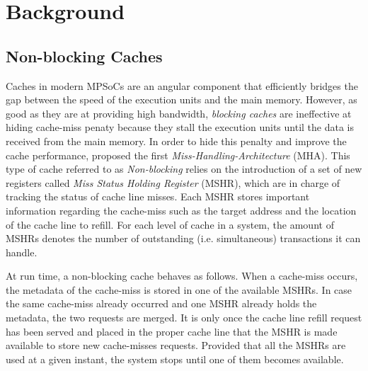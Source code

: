 \section{Background}
    \subsection{Non-blocking Caches}
        Caches in modern MPSoCs are an angular component that efficiently bridges the gap between the speed of the execution units and the main memory.
        However, as good as they are at providing high bandwidth, \emph{blocking caches} are ineffective at hiding cache-miss penaty because they stall the execution units until the data is received from the main memory.
        In order to hide this penalty and improve the cache performance, \cite{Kroft} proposed the first \emph{Miss-Handling-Architecture} (MHA).
        This type of cache referred to as \emph{Non-blocking} relies on the introduction of a set of new registers called \emph{Miss Status Holding Register} (MSHR), which are in charge of tracking the status of cache line misses.
        Each MSHR stores important information regarding the cache-miss such as the target address and the location of the cache line to refill.
        For each level of cache in a system, the amount of MSHRs denotes the number of outstanding (i.e. simultaneous) transactions it can handle.

        At run time, a non-blocking cache behaves as follows. When a cache-miss occurs, the metadata of the cache-miss is stored in one of the available MSHRs. In case the same cache-miss already occurred and one MSHR already holds the metadata, the two requests are merged.
        It is only once the cache line refill request has been served and placed in the proper cache line that the MSHR is made available to store new cache-misses requests.
        Provided that all the MSHRs are used at a given instant, the system stops until one of them becomes available.

